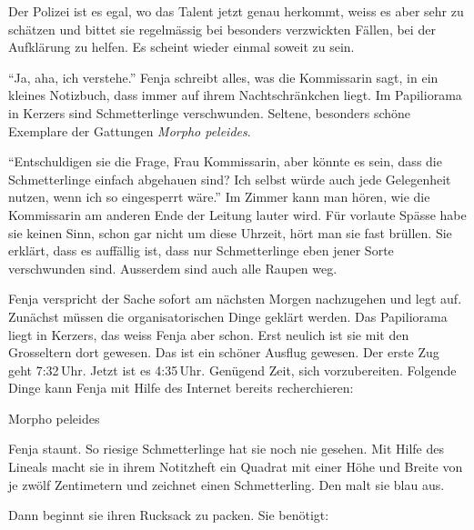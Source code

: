 Der Polizei ist es egal, wo das Talent jetzt genau herkommt, weiss es aber sehr zu schätzen und bittet sie regelmässig bei besonders verzwickten Fällen, bei der Aufklärung zu helfen. Es scheint wieder einmal soweit zu sein.

\enquote{Ja, aha, ich verstehe.} Fenja schreibt alles, was die Kommissarin sagt, in ein kleines Notizbuch, dass immer auf ihrem Nachtschränkchen liegt. Im Papiliorama in Kerzers sind Schmetterlinge verschwunden. Seltene, besonders schöne Exemplare der Gattungen \emph{Morpho peleides}.

\enquote{Entschuldigen sie die Frage, Frau Kommissarin, aber könnte es sein, dass die Schmetterlinge einfach abgehauen sind? Ich selbst würde auch jede Gelegenheit nutzen, wenn ich so eingesperrt wäre.} Im Zimmer kann man hören, wie die Kommissarin am anderen Ende der Leitung lauter wird. Für vorlaute Spässe habe sie keinen Sinn, schon gar nicht um diese Uhrzeit, hört man sie fast brüllen. Sie erklärt, dass es auffällig ist, dass nur Schmetterlinge eben jener Sorte verschwunden sind. Ausserdem sind auch alle Raupen weg.

Fenja verspricht der Sache sofort am nächsten Morgen nachzugehen und legt auf. Zunächst müssen die organisatorischen Dinge geklärt werden. Das Papiliorama liegt in Kerzers, das weiss Fenja aber schon. Erst neulich ist sie mit den Grosseltern dort gewesen. Das ist ein schöner Ausflug gewesen. Der erste Zug geht 7:32\,Uhr. Jetzt ist es 4:35\,Uhr. Genügend Zeit, sich vorzubereiten. Folgende Dinge kann Fenja mit Hilfe des Internet bereits recherchieren:

\begin{description}
	\item[Morpho peleides] 
\end{description}

Fenja staunt. So riesige Schmetterlinge hat sie noch nie gesehen. Mit Hilfe des Lineals macht sie in ihrem Notitzheft ein Quadrat mit einer Höhe und Breite von je zwölf Zentimetern und zeichnet einen Schmetterling. Den malt sie blau aus. 

Dann beginnt sie ihren Rucksack zu packen. Sie benötigt:

